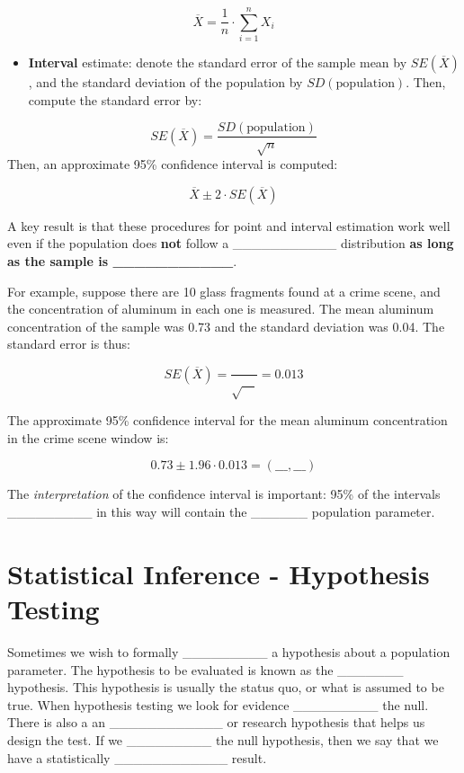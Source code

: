 \documentclass[]{book}
\providecommand{\tightlist}{%
  \setlength{\itemsep}{0pt}\setlength{\parskip}{0pt}}
\theoremstyle{definition}
\theoremstyle{definition}
\theoremstyle{remark}
\begin{document}
\[\overline{X} = \frac{1}{n} \cdot \sum\limits_{i=1}^n X_i\]

\begin{itemize}
\tightlist
\item
  \textbf{Interval} estimate: denote the standard error of the sample
  mean by \(SE(\overline{X})\), and the standard deviation of the
  population by \(SD(\text{population})\). Then, compute the standard
  error by:
\end{itemize}

\[ SE(\overline{X}) = \frac{SD(\text{population})}{\sqrt{n}}\] Then, an
approximate 95\% confidence interval is computed:

\begin{equation}\label{eq:ci}
\overline{X} \pm 2 \cdot SE(\overline{X})
\end{equation}

A key result is that these procedures for point and interval estimation
work well even if the population does \textbf{not} follow a
\_\_\_\_\_\_\_\_\_\_\_ distribution \textbf{as long as the sample is
\_\_\_\_\_\_\_\_\_\_\_}.

For example, suppose there are 10 glass fragments found at a crime
scene, and the concentration of aluminum in each one is measured. The
mean aluminum concentration of the sample was 0.73 and the standard
deviation was 0.04. The standard error is thus:

\[ SE(\overline{X}) = \frac{}{\sqrt{\quad}} = 0.013\]

The approximate 95\% confidence interval for the mean aluminum
concentration in the crime scene window is:

\[ 0.73 \pm 1.96 \cdot 0.013 = (\_\_\_,\_\_\_)\]

The \emph{interpretation} of the confidence interval is important: 95\%
of the intervals \_\_\_\_\_\_\_\_\_ in this way will contain the
\_\_\_\_\_\_ population parameter.

\section{Statistical Inference - Hypothesis
Testing}\label{statistical-inference---hypothesis-testing}

Sometimes we wish to formally \_\_\_\_\_\_\_\_\_ a hypothesis about a
population parameter. The hypothesis to be evaluated is known as the
\_\_\_\_\_\_\_ hypothesis. This hypothesis is usually the status quo, or
what is assumed to be true. When hypothesis testing we look for evidence
\_\_\_\_\_\_\_\_\_ the null. There is also a an \_\_\_\_\_\_\_\_\_\_\_\_
or research hypothesis that helps us design the test. If we
\_\_\_\_\_\_\_\_\_ the null hypothesis, then we say that we have a
statistically \_\_\_\_\_\_\_\_\_\_\_\_ result.
\end{document}
